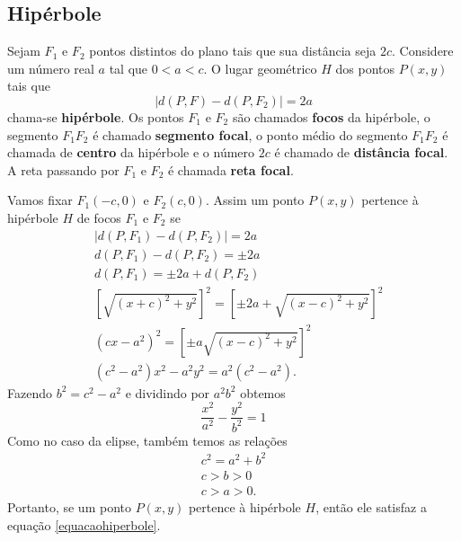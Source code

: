
\subsection{Hip\'erbole} %
\label{sub:hiperbole}

\begin{definicao}
  Sejam $F_1$ e $F_2$ pontos distintos do plano tais que sua dist\^ancia seja $2c$. Considere um n\'umero real $a$ tal que $0 < a < c$. O lugar geom\'etrico $H$ dos pontos $P(x,y)$ tais que 
  \begin{equation}\label{equacaohiperbole}
    | d(P,F) - d(P,F_2)| = 2a
  \end{equation}
  chama-se \textbf{hip\'erbole}. Os pontos $F_1$ e $F_2$ s\~ao chamados \textbf{focos} da hip\'erbole, o segmento $F_1F_2$ \'e chamado \textbf{segmento focal}, o ponto m\'edio do segmento $F_1F_2$ \'e chamada de \textbf{centro} da hip\'erbole e o n\'umero $2c$ \'e chamado de \textbf{dist\^ancia focal}. A reta passando por $F_1$ e $F_2$ \'e chamada \textbf{reta focal}.     
\end{definicao}

Vamos fixar $F_1(-c,0)$ e $F_2(c,0)$. Assim um ponto $P(x,y)$ pertence \`a hip\'erbole $H$ de focos $F_1$ e $F_2$ se
\begin{align*}
  &| d(P,F_1) - d(P,F_2) | = 2a\\
  &d(P,F_1) - d(P,F_2) = \pm 2a\\
  &d(P,F_1) = \pm 2a + d(P,F_2)\\
  &\left[\sqrt{(x + c)^2 + y^2}\right]^2 = \left[\pm 2a + \sqrt{(x - c)^2 + y^2}\right]^2\\
  &(cx - a^2)^2 = \left[\pm a\sqrt{(x - c)^2 + y^2}\right]^2\\
  &(c^2 - a^2)x^2 - a^2y^2 = a^2(c^2 - a^2).
\end{align*}
Fazendo $b^2 = c^2 - a^2$ e dividindo por $a^2b^2$ obtemos
\begin{equation}
  \dfrac{x^2}{a^2} - \dfrac{y^2}{b^2} = 1
\end{equation}
Como no caso da elipse, tamb\'em temos as rela\c{c}\~oes
\begin{align}
  c^2 = a^2 + b^2\\
  c > b > 0\label{pitagorashiperbole}\\
  c > a > 0.
\end{align}
Portanto, se um ponto $P(x,y)$ pertence \`a hip\'erbole $H$, ent\~ao ele satisfaz a equa\c{c}\~ao \eqref{equacaohiperbole}.


